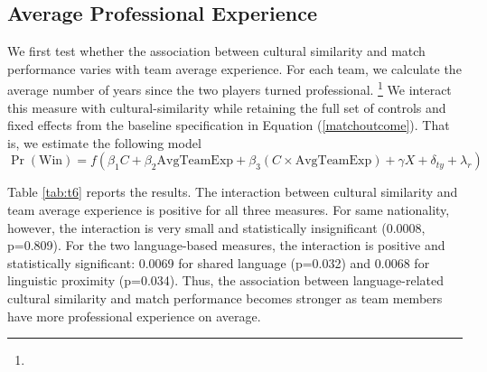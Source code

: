 \documentclass[10pt]{article}
\begin{document}
\subsection{Average Professional Experience} 










We first test whether the association between cultural similarity and match performance varies with team average experience. For each team, we calculate the average number of years since the two players turned professional. \footnote{} We interact this measure with cultural-similarity while retaining the full set of controls and fixed effects from the baseline specification in Equation (\ref{matchoutcome}). That is, we estimate the following model
\begin{equation}
\operatorname{Pr}(\text{Win}) = f(\beta_1 C + \beta_2 \text{AvgTeamExp} + \beta_3 (C \times \text{AvgTeamExp}) + \gamma X + \delta_{ty} + \lambda_r)
\end{equation}


Table \ref{tab:t6} reports the results. The interaction between cultural similarity and team average experience is positive for all three measures. For same nationality, however, the interaction is very small and statistically insignificant (0.0008, p=0.809). For the two language-based measures, the interaction is positive and statistically significant: 0.0069 for shared language (p=0.032) and 0.0068 for linguistic proximity (p=0.034). Thus, the association between language-related cultural similarity and match performance becomes stronger as team members have more professional experience on average.
\end{document}
